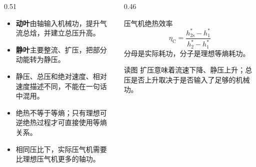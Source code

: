 \begin{frame}[t,shrink]{}
\begin{columns}[T,onlytextwidth]
\begin{column}{0.51\textwidth}
  \begin{itemize}
    \item \textbf{动叶}由轴输入机械功，提升气流总焓，并建立总压升高。
    \item \textbf{静叶}主要整流、扩压，把部分动能转为静压。
    \item 静压、总压和绝对速度、相对速度描述不同，不能在一句话中混用。
    \item 绝热不等于等熵；只有理想可逆绝热过程才可直接使用等熵关系。
    \item 相同压比下，实际压气机需要比理想压气机更多的轴功。
  \end{itemize}
\end{column}
\begin{column}{0.46\textwidth}
  \begin{keybox}{压气机绝热效率}
  \small
  $$
  \eta_{\mathrm{C}}
  =\frac{h_{2\mathrm{s}}^*-h_1^*}{h_2^*-h_1^*}
  $$
  分母是实际耗功，分子是理想等熵耗功。
  \end{keybox}
  \vspace{0.6mm}
  \begin{amberbox}{读图}
  \small 扩压意味着流速下降、静压上升；总压是否上升取决于是否输入了足够的机械功。
  \end{amberbox}
\end{column}
\end{columns}
\end{frame}

